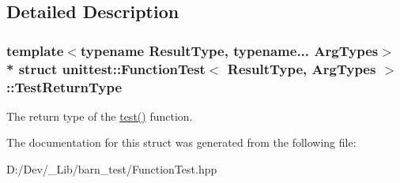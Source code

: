 \subsection{Detailed Description}
\subsubsection*{template$<$typename Result\+Type, typename... Arg\+Types$>$\\*
struct unittest\+::\+Function\+Test$<$ Result\+Type, Arg\+Types $>$\+::\+Test\+Return\+Type}

The return type of the \hyperlink{classunittest_1_1_function_test_a25ae63b50e7339b313ed11e0ba1e02dc}{test()} function. 

The documentation for this struct was generated from the following file\+:\begin{DoxyCompactItemize}
\item 
D\+:/\+Dev/\+\_\+\+Lib/barn\+\_\+test/Function\+Test.\+hpp\end{DoxyCompactItemize}
